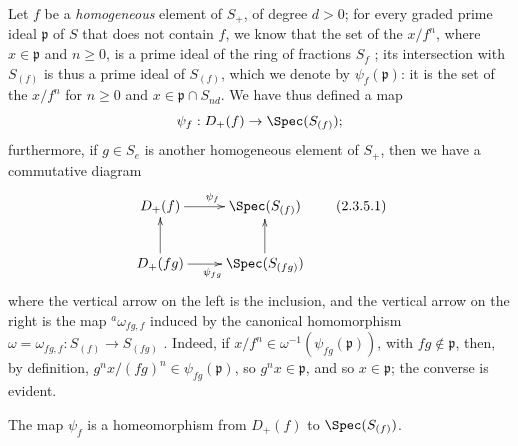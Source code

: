 \begin{env}[2.3.5]
\label{II.2.3.5}
Let $f$ be a \emph{homogeneous} element of $S_+$, of degree $d>0$;
for every graded prime ideal $\mathfrak{p}$ of $S$ that does not contain $f$, we know that the set of the $x/f^n$, where $x\in\mathfrak{p}$ and $n\geq0$, is a prime ideal of the ring of fractions $S_f$ ;
its intersection with $S_{(f)}$ is thus a prime ideal of $S_{(f)}$, which we denote by $\psi_f(\mathfrak{p})$:
it is the set of the $x/f^n$ for $n\geq0$ and $x\in\mathfrak{p}\cap S_{nd}$.
We have thus defined a map
\[
  \psi_f: D_+(f)\to\Spec(S_{(f)});
\]
furthermore, if $g\in S_e$ is another homogeneous element of $S_+$, then we have a commutative diagram
\[
\label{II.2.3.5.1}
  \xymatrix{
    D_+(f) \ar[r]^{\psi_f}
    & \Spec(S_{(f)})
  \\D_+(fg) \ar[u] \ar[r]_{\psi_{fg}}
    & \Spec(S_{(fg)}) \ar[u]
  }
\tag{2.3.5.1}
\]
where the vertical arrow on the left is the inclusion, and the vertical arrow on the right is the map ${}^a\!\omega_{fg,f}$ induced by the canonical homomorphism $\omega=\omega_{fg,f}: S_{(f)}\to S_{(fg)}$ .
Indeed, if $x/f^n\in\omega^{-1}(\psi_{fg}(\mathfrak{p}))$, with $fg\not\in\mathfrak{p}$, then, by definition, $g^nx/(fg)^n\in\psi_{fg}(\mathfrak{p})$, so $g^nx\in\mathfrak{p}$, and so $x\in\mathfrak{p}$;
the converse is evident.
\end{env}

\begin{proposition}[2.3.6]
\label{II.2.3.6}
The map $\psi_f$ is a homeomorphism from $D_+(f)$ to $\Spec(S_{(f)})$.
\end{proposition}

